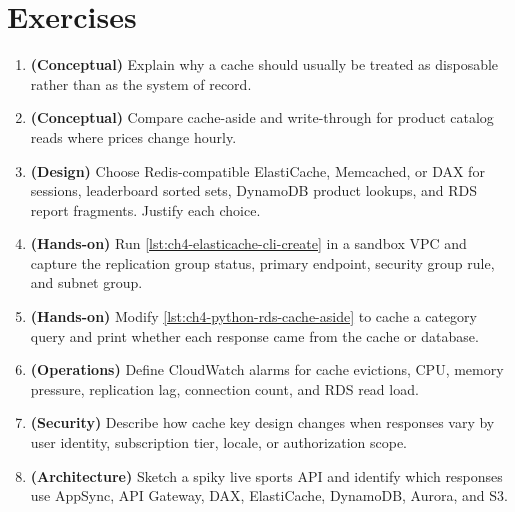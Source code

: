 \section{Exercises}
\begin{enumerate}
    \item \textbf{(Conceptual)} Explain why a cache should usually be treated as disposable rather than as the system of record.
    \item \textbf{(Conceptual)} Compare cache-aside and write-through for product catalog reads where prices change hourly.
    \item \textbf{(Design)} Choose Redis-compatible ElastiCache, Memcached, or DAX for sessions, leaderboard sorted sets, DynamoDB product lookups, and RDS report fragments. Justify each choice.
    \item \textbf{(Hands-on)} Run \cref{lst:ch4-elasticache-cli-create} in a sandbox VPC and capture the replication group status, primary endpoint, security group rule, and subnet group.
    \item \textbf{(Hands-on)} Modify \cref{lst:ch4-python-rds-cache-aside} to cache a category query and print whether each response came from the cache or database.
    \item \textbf{(Operations)} Define CloudWatch alarms for cache evictions, CPU, memory pressure, replication lag, connection count, and RDS read load.
    \item \textbf{(Security)} Describe how cache key design changes when responses vary by user identity, subscription tier, locale, or authorization scope.
    \item \textbf{(Architecture)} Sketch a spiky live sports API and identify which responses use AppSync, API Gateway, DAX, ElastiCache, DynamoDB, Aurora, and S3.
\end{enumerate}
